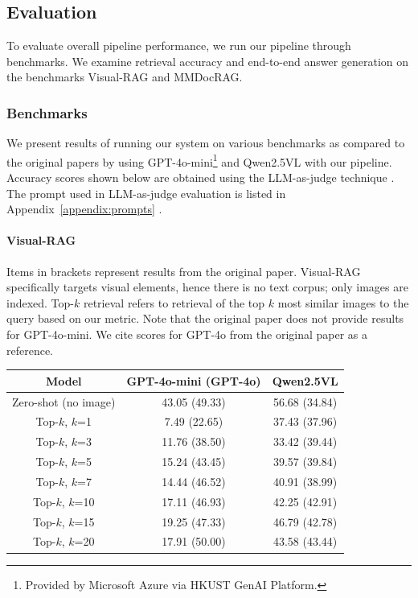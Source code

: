 \newpage
\subsection{Evaluation}
\label{sec:evaluation}

To evaluate overall pipeline performance, we run our pipeline through benchmarks.
We examine retrieval accuracy and end-to-end answer generation on the benchmarks Visual-RAG and MMDocRAG.

\subsubsection{Benchmarks}

We present results of running our system on various benchmarks as compared to the original papers by using GPT-4o-mini\footnote{Provided by Microsoft Azure via HKUST GenAI Platform.} 
and Qwen2.5VL with our pipeline.
Accuracy scores shown below are obtained using the LLM-as-judge technique \cite{gu2025surveyllmasajudge}.
The prompt used in LLM-as-judge evaluation is listed in Appendix~\ref{appendix:prompts} .

\paragraph{Visual-RAG}

Items in brackets represent results from the original paper.
Visual-RAG specifically targets visual elements, hence there is no text corpus; only images are indexed.
Top-$k$ retrieval refers to retrieval of the top $k$ most similar images to the query based on our metric.
Note that the original paper does not provide results for GPT-4o-mini.
We cite scores for GPT-4o from the original paper as a reference.

\begin{tabularx}{\textwidth}{@{} c | c c @{}}
    \toprule
    Model & GPT-4o-mini (GPT-4o) & Qwen2.5VL \\
    \midrule
    \endhead
    Zero-shot (no image) & 43.05 (49.33) & 56.68 (34.84) \\
    \midrule
    Top-$k$, $k$=1 & 7.49 (22.65) & 37.43 (37.96) \\
    Top-$k$, $k$=3 & 11.76 (38.50) & 33.42 (39.44) \\
    Top-$k$, $k$=5 & 15.24 (43.45) & 39.57 (39.84) \\
    Top-$k$, $k$=7 & 14.44 (46.52) & 40.91 (38.99) \\
    Top-$k$, $k$=10 & 17.11 (46.93) & 42.25 (42.91) \\
    Top-$k$, $k$=15 & 19.25 (47.33) & 46.79 (42.78) \\
    Top-$k$, $k$=20 & 17.91 (50.00) & 43.58 (43.44) \\
    \bottomrule
\end{tabularx}

